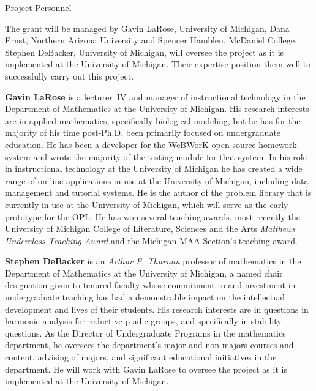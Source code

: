 \documentclass[11pt]{article}
\begin{document}
\begin{section}{Project Personnel}

The grant will be managed by Gavin LaRose, University of Michigan, Dana
Ernst, Northern Arizona University and Spencer Hamblen, McDaniel College.
Stephen DeBacker, University of Michigan, will oversee the project as it
is implemented at the University of Michigan.  Their expertise position
them well to successfully carry out this project.

\textbf{Gavin LaRose} is a lecturer~IV and manager of instructional
technology in the Department of Mathematics at the University of Michigan.
His research interests are in applied mathematics, specifically biological
modeling, but he has for the majority of his time post-Ph.D. been
primarily focused on undergraduate education.  He has been a developer for
the WeBWorK open-source homework system and wrote the majority of the
testing module for that system.  In his role in instructional technology
at the University of Michigan he has created a wide range of on-line
applications in use at the University of Michigan, including data
management and tutorial systems.  He is the author of the problem library
that is currently in use at the University of Michigan, which will serve
as the early prototype for the OPL.  He has won several teaching awards,
most recently the University of Michigan College of Literature, Sciences
and the Arts \emph{Matthews Underclass Teaching Award} and the Michigan
MAA Section's teaching award.

\textbf{Stephen DeBacker} is an \emph{Arthur F. Thurnau} professor of
mathematics in the Department of Mathematics at the University of
Michigan, a named chair designation given to tenured faculty whose
commitment to and investment in undergraduate teaching has had a
demonstrable impact on the intellectual development and lives of their
students.  His research interests are in questions in harmonic analysis
for reductive p-adic groups, and specifically in stability questions.  As
the Director of Undergraduate Programs in the mathematics department, he
oversees the department's major and non-majors courses and content,
advising of majors, and significant educational initiatives in the
department.  He will work with Gavin LaRose to oversee the project as it
is implemented at the University of Michigan.


\end{section}
\end{document}
